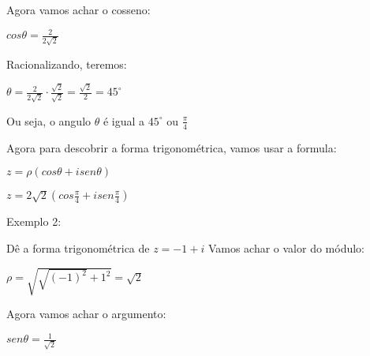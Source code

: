 \documentclass[]{article}
\begin{document}
\begin{large}
\begin{flushleft}
Agora vamos achar o cosseno: \vspace{.3cm}

\begin{center}
    $cos\theta=\frac{2}{2\sqrt{2}}$
\end{center}

Racionalizando, teremos: \vspace{.3cm}

\begin{center}
    $\theta=\frac{2}{2\sqrt{2}} \cdot \frac{\sqrt{2}}{\sqrt{2}} = \frac{\sqrt{2}}{2} = 45^\circ$ \vspace{.3cm}
\end{center}

Ou seja, o angulo $\theta$ é igual a $45^\circ$ ou $\frac{\pi}{4}$ \vspace{.3cm}

Agora para descobrir a forma trigonométrica, vamos usar a formula: \vspace{.3cm}

\begin{center}
    $z=\rho(cos\theta + isen\theta)$ \vspace{.3cm}
    
     \vspace{.3cm}
    
    $z=2\sqrt{2}(cos\frac{\pi}{4} + isen\frac{\pi}{4})$ \vspace{.3cm}
    
     \vspace{.3cm}
\end{center}

Exemplo 2: \vspace{.3cm}

Dê a forma trigonométrica de $z=-1+i$
Vamos achar o valor do módulo: \vspace{.3cm}

\begin{center}
    $\rho=\sqrt{\sqrt{(-1)^2}+1^2} = \sqrt{2}$ \vspace{.3cm}
\end{center}

Agora vamos achar o argumento: \vspace{.3cm}

\begin{center}
    $sen\theta=\frac{1}{\sqrt{2}}$ \vspace{.cm}
\end{center}


\end{flushleft}
\end{large}
\end{document}
